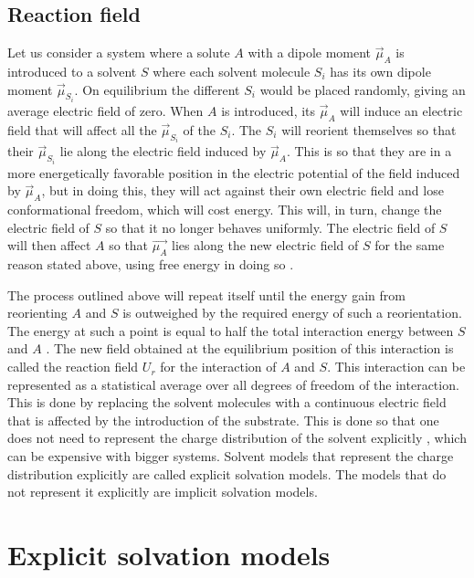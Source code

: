 \documentclass[../master_thesis.tex]{subfiles}
\begin{document}
\subsection{Reaction field}\label{Reaction_field}
Let us consider a system where a solute $A$ with a dipole moment $\vec{\mu}_A$ is
introduced to a solvent $S$ where each solvent molecule $S_i$ has its own dipole
moment $\vec{\mu}_{S_i}$. On equilibrium the different $S_i$  would be placed
randomly, giving an average electric field of zero. When $A$ is introduced, its
$\vec{\mu}_A$ will induce an electric field that will affect all the
$\vec{\mu}_{S_i}$ of the $S_i$. The $S_i$ will reorient themselves so that their
$\vec{\mu}_{S_i}$ lie along the electric field induced by $\vec{\mu}_A$. This is
so that they are in a more energetically favorable position in the electric
potential of the field induced by $\vec{\mu}_A$, but in doing this, they will
act against their own electric field and lose conformational freedom, which will
cost energy. This will, in turn, change the electric field of $S$ so that it no
longer behaves uniformly. The electric field of $S$ will then affect $A$ so that
$\vec{\mu_A}$ lies along the new electric field of $S$ for the same reason
stated above, using free energy in doing so \cite{Cramer:2004}.

The process outlined above will repeat itself until the energy gain from
reorienting $A$ and $S$ is outweighed by the required energy of such a
reorientation. The energy at such a point is equal to half the total interaction
energy between $S$ and $A$ \cite{Cramer:2004}. The new field obtained at the
equilibrium position of this interaction is called the reaction field $U_r$ for
the interaction of $A$ and $S$.
This interaction can be represented as a statistical average over all degrees of freedom of
the interaction. This is done by replacing the solvent molecules with a continuous electric
field that is affected by the introduction of the substrate. This is done so
that one does not need to represent the charge distribution of the solvent explicitly \cite{Cramer:2004},
which can be expensive with bigger systems.
Solvent models that represent the charge distribution explicitly are called
explicit solvation models. The models that do not represent it explicitly are
implicit solvation models.

\section{Explicit solvation models}
\end{document}
